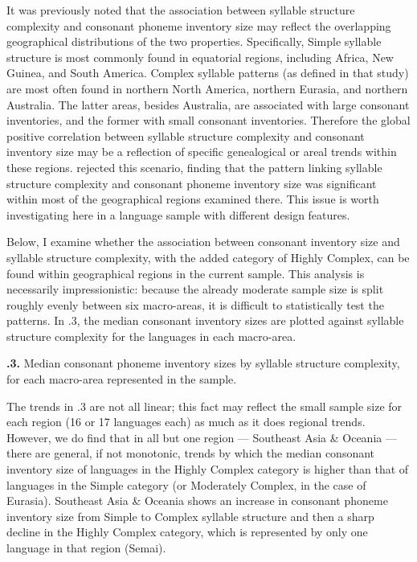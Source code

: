   It was previously noted that the association between syllable structure complexity and consonant phoneme inventory size may reflect the overlapping geographical distributions of the two properties. Specifically, Simple syllable structure is most commonly found in equatorial regions, including Africa, New Guinea, and South America. Complex syllable patterns (as defined in that study) are most often found in northern North America, northern Eurasia, and northern Australia. The latter areas, besides Australia, are associated with large consonant inventories, and the former with small consonant inventories. Therefore the global positive correlation between syllable structure complexity and consonant inventory size may be a reflection of specific genealogical or areal trends within these regions. \citet{Maddieson2006} rejected this scenario, finding that the pattern linking syllable structure complexity and consonant phoneme inventory size was significant within most of the geographical regions examined there. This issue is worth investigating here in a language sample with different design features.

  Below, I examine whether the association between consonant inventory size and syllable structure complexity, with the added category of Highly Complex, can be found within geographical regions in the current sample. This analysis is necessarily impressionistic: because the already moderate sample size is split roughly evenly between six macro-areas, it is difficult to statistically test the patterns. In .3, the median consonant inventory sizes are plotted against syllable structure complexity for the languages in each macro-area.

\textbf{.3.} Median consonant phoneme inventory sizes by syllable structure complexity, for each macro-area represented in the sample.

  The trends in .3 are not all linear; this fact may reflect the small sample size for each region (16 or 17 languages each) as much as it does regional trends. However, we do find that in all but one region — Southeast Asia \& Oceania — there are general, if not monotonic, trends by which the median consonant inventory size of languages in the Highly Complex category is higher than that of languages in the Simple category (or Moderately Complex, in the case of Eurasia). Southeast Asia \& Oceania shows an increase in consonant phoneme inventory size from Simple to Complex syllable structure and then a sharp decline in the Highly Complex category, which is represented by only one language in that region (Semai).

